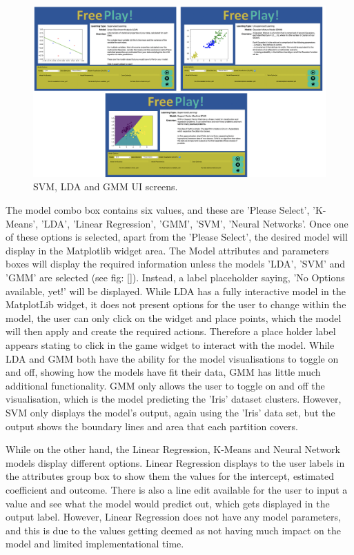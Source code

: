		\begin{figure}[t]
			\includegraphics[width=15cm]{graphics/remaining_fp_examples.png}
			\caption{SVM, LDA and GMM UI screens.}
			\label{fig:km_example}
		\end{figure}
		
		The model combo box contains six values, and these are 'Please Select', 'K-Means', 'LDA', 'Linear Regression', 'GMM', 'SVM', 'Neural Networks'. Once one of these options is selected, apart from the 'Please Select', the desired model will display in the Matplotlib widget area. The Model attributes and parameters boxes will display the required information unless the models 'LDA', 'SVM' and 'GMM' are selected (see fig: \ref{}). Instead, a label placeholder saying, 'No Options available, yet!' will be displayed. While LDA has a fully interactive model in the MatplotLib widget, it does not present options for the user to change within the model, the user can only click on the widget and place points, which the model will then apply and create the required actions. Therefore a place holder label appears stating to click in the game widget to interact with the model. While LDA and GMM both have the ability for the model visualisations to toggle on and off, showing how the models have fit their data, GMM has little much additional functionality. GMM only allows the user to toggle on and off the visualisation, which is the model predicting the 'Iris' dataset clusters. However, SVM only displays the model's output, again using the 'Iris' data set, but the output shows the boundary lines and area that each partition covers.
		
		While on the other hand, the Linear Regression, K-Means and Neural Network models display different options. Linear Regression displays to the user labels in the attributes group box to show them the values for the intercept, estimated coefficient and outcome. There is also a line edit available for the user to input a value and see what the model would predict out, which gets displayed in the output label. However, Linear Regression does not have any model parameters, and this is due to the values getting deemed as not having much impact on the model and limited implementational time. 
		
